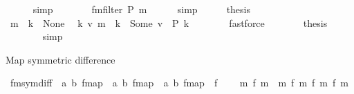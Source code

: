 \begin{isabellebody}
\ \ \ \ \isamarkupfalse%
\ simp\isanewline
\ \ \isamarkupfalse%
\ \isamarkupfalse%
\ {\isachardoublequoteopen}{\isasymdots}\ {\isacharequal}{\kern0pt}\ fmfilter\ {\isacharquery}{\kern0pt}P\ m{\isachardoublequoteclose}\isanewline
\ \ \ \ \isamarkupfalse%
\ simp\isanewline
\ \ \isamarkupfalse%
\ \isamarkupfalse%
\ {\isacharquery}{\kern0pt}thesis\isanewline
\ \ \isamarkupfalse%
\ {\isacharminus}{\kern0pt}\isanewline
\ \ \ \ \isamarkupfalse%
\ {\isacartoucheopen}m\ {\isachardollar}{\kern0pt}{\isachardollar}{\kern0pt}\ k\ {\isacharequal}{\kern0pt}\ None{\isacartoucheclose}\ \isamarkupfalse%
\ {\isachardoublequoteopen}{\isasymAnd}k{\isacharprime}{\kern0pt}\ v{\isacharprime}{\kern0pt}{\isachardot}{\kern0pt}\ m\ {\isachardollar}{\kern0pt}{\isachardollar}{\kern0pt}\ k{\isacharprime}{\kern0pt}\ {\isacharequal}{\kern0pt}\ Some\ v{\isacharprime}{\kern0pt}\ {\isasymLongrightarrow}\ {\isacharquery}{\kern0pt}P\ k{\isacharprime}{\kern0pt}{\isachardoublequoteclose}\isanewline
\ \ \ \ \ \ \isamarkupfalse%
\ fastforce\isanewline
\ \ \ \ \isamarkupfalse%
\ \isamarkupfalse%
\ {\isacharquery}{\kern0pt}thesis\isanewline
\ \ \ \ \ \ \isamarkupfalse%
\ simp\isanewline
\ \ \isamarkupfalse%
\isanewline
{}\isamarkupfalse%
%
\endisatagproof
{\isafoldproof}%
%
\isadelimproof
%
\endisadelimproof
%
\begin{isamarkuptext}%
Map symmetric difference%
\end{isamarkuptext}\isamarkuptrue%
\isamarkupfalse%
\ fmsym{\isacharunderscore}{\kern0pt}diff\ {\isacharcolon}{\kern0pt}{\isacharcolon}{\kern0pt}\ {\isachardoublequoteopen}{\isacharparenleft}{\kern0pt}{\isacharprime}{\kern0pt}a{\isacharcomma}{\kern0pt}\ {\isacharprime}{\kern0pt}b{\isacharparenright}{\kern0pt}\ fmap\ {\isasymRightarrow}\ {\isacharparenleft}{\kern0pt}{\isacharprime}{\kern0pt}a{\isacharcomma}{\kern0pt}\ {\isacharprime}{\kern0pt}b{\isacharparenright}{\kern0pt}\ fmap\ {\isasymRightarrow}\ {\isacharparenleft}{\kern0pt}{\isacharprime}{\kern0pt}a{\isacharcomma}{\kern0pt}\ {\isacharprime}{\kern0pt}b{\isacharparenright}{\kern0pt}\ fmap{\isachardoublequoteclose}\ {\isacharparenleft}{\kern0pt}\ {\isacartoucheopen}{\isasymDelta}\isactrlsub f{\isacartoucheclose}\ {}{}{}{\isacharparenright}{\kern0pt}\ \isanewline
\ \ {\isachardoublequoteopen}m\ {\isasymDelta}\isactrlsub f\ m\ {\isasymequiv}\ {\isacharparenleft}{\kern0pt}m\ {\isacharminus}{\kern0pt}{\isacharminus}{\kern0pt}\isactrlsub f\ m\ {\isacharplus}{\kern0pt}{\isacharplus}{\kern0pt}\isactrlsub f\ {\isacharparenleft}{\kern0pt}m\ {\isacharminus}{\kern0pt}{\isacharminus}{\kern0pt}\isactrlsub f\ m%

\end{isabellebody}
